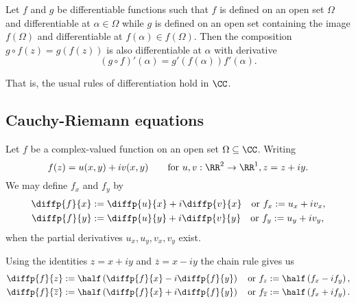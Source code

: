 \documentclass[12pt, a4paper]{article}
\begin{document}
\begin{proposition}
    Let \(f\) and \(g\) be differentiable functions such that \(f\) is defined on an open set \(\Omega\) and differentiable at \(\alpha \in \Omega\) while \(g\) is defined on an open set containing the image \(f(\Omega)\) and differentiable at \(f(\alpha) \in f(\Omega)\). Then the composition \(g \circ f(z) =g(f(z))\) is also differentiable at \(\alpha\) with derivative
    \[(g \circ f)'(\alpha) = g'(f(\alpha))f'(\alpha).\]
\end{proposition}

\begin{mdnote}
    That is, the usual rules of differentiation hold in \(\CC\).
\end{mdnote}

\subsection{Cauchy-Riemann equations}

\begin{definition}
    Let \(f\) be a complex-valued function on an open set \(\Omega \subseteq \CC\). Writing 
    \[f(z) = u(x,y)+i v(x,y) \qquad \text{for } u,v : \RR^2 \to \RR^1, z= z+iy.\]
    We may define \(f_x\) and \(f_y\) by 
    \[\begin{aligned}
        \diffp{f}{x} &:= \diffp{u}{x}+i \diffp{v}{x} \quad \text{or } f_x :=u_x +iv_x, \\
        \diffp{f}{y} &:= \diffp{u}{y}+i \diffp{v}{y} \quad \text{or } f_y :=u_y +iv_y,
    \end{aligned}\]
    when the partial derivatives \(u_x,u_y,v_x,v_y\) exist.
\end{definition}

\begin{theorem}
    Using the identities \(z =x+iy\) and \(\overline{z}=x-iy\) the chain rule gives us 
    \[\begin{aligned}
        \diffp{f}{z} &:= \half \left( \diffp{f}{x}-i\diffp{f}{y} \right)  \quad \text{or } f_z := \half\left( f_x -if_y \right), \\
        \diffp{f}{{\overline{z}}} &:= \half \left( \diffp{f}{x}+i\diffp{f}{y} \right)  \quad \text{or } f_{\overline{z}} := \half\left( f_x +if_y \right).
    \end{aligned}\]
\end{theorem}
\end{document}
